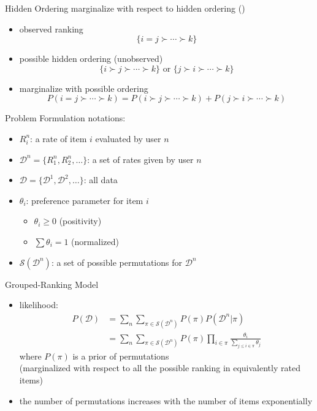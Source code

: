 \documentclass[fleqn,aspectratio=1610]{beamer}
\begin{document}
\begin{frame}[label={sec:org1d851b4}]{Hidden Ordering}
marginalize with respect to hidden ordering (\cite{HinoFujimotoMurata2010})

\begin{itemize}
\item observed ranking
\begin{equation}
  \{i=j\succ\cdots\succ k\}
\end{equation}
\item possible hidden ordering (unobserved)
\begin{equation}
  \{i\succ j\succ\cdots\succ k\}
  \text{ or }
  \{j\succ i\succ\cdots\succ k\}
\end{equation}
\item marginalize with possible ordering 
\begin{equation}
  P(i=j\succ\cdots\succ k)
  =P(i\succ j\succ\cdots\succ k)
  +P(j\succ i\succ\cdots\succ k)
\end{equation}
\end{itemize}
\end{frame}

\begin{frame}[label={sec:orge36146d}]{Problem Formulation}
notations:
\begin{itemize}
\item \(R_i^n\): 
a rate of item \(i\) evaluated by user \(n\)
\item \(\mathcal{D}^n=\{R_1^n,R_2^n,\dots\}\): 
a set of rates given by user \(n\)
\item \(\mathcal{D}=\{\mathcal{D}^1,\mathcal{D}^2,\dots\}\): 
all data
\medskip
\item \(\theta_i\): preference parameter for item \(i\)
\begin{itemize}
\item \(\theta_i\ge0\) (positivity)
\item \(\sum\theta_i=1\) (normalized)
\end{itemize}
\item \(\mathcal{S}(\mathcal{D}^n)\):
a set of possible permutations for \(\mathcal{D}^n\)
\end{itemize}
\end{frame}

\begin{frame}[label={sec:org032c885}]{Grouped-Ranking Model}
\begin{itemize}
\item likelihood:
\begin{align}
  P(\mathcal{D})
  &=\sum_{n}\sum_{\pi\in\mathcal{S}(\mathcal{D}^n)}
    P(\pi)P(\mathcal{D}^n|\pi)\\
  &=\sum_{n}\sum_{\pi\in\mathcal{S}(\mathcal{D}^n)}
    P(\pi)\prod_{i\in\pi}\frac{\theta_i}{\sum_{j\le i\in\pi}\theta_j}
\end{align}
where \(P(\pi)\) is a prior of permutations\\[0pt]
(marginalized with respect to all the possible ranking in
equivalently rated items)
\item the number of permutations increases 
with the number of items \alert{exponentially}
\end{itemize}
\end{frame}
\end{document}
